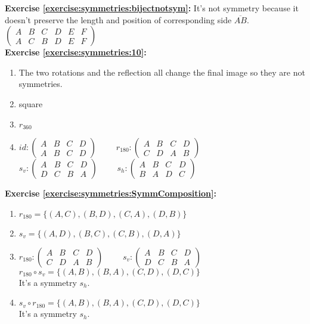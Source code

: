 \noindent\textbf{Exercise \ref{exercise:symmetries:bijectnotsym}:}
It's not symmetry because it doesn't preserve the length and position of corresponding side $\overline{AB}$.\\
$\begin{pmatrix}
A & B & C & D & E & F\\
A & C & B & D & E & F
\end{pmatrix}$\\

\noindent\textbf{Exercise \ref{exercise:symmetries:10}:}
\begin{enumerate}[{a.}]
\item
The two rotations and the reflection all change the final image so they are not symmetries.
\item
square
\item
$r_{360}$
\item
$id: \begin{pmatrix}
A & B & C & D\\
A & B & C & D
\end{pmatrix}$
$\qquad r_{180}: \begin{pmatrix}
A & B & C & D\\
C & D & A & B
\end{pmatrix}$\\
$s_{v}: \begin{pmatrix}
A & B & C & D\\
D & C & B & A
\end{pmatrix}$
$\qquad s_{h}: \begin{pmatrix}
A & B & C & D\\
B & A & D & C
\end{pmatrix}$\\
\end{enumerate}

\noindent\textbf{Exercise \ref{exercise:symmetries:SymmComposition}:}
\begin{enumerate}[{a.}]
\item
$r_{180} = \{(A, C), (B, D), (C, A), (D, B)\}$
\item
$s_v = \{(A, D), (B, C), (C, B), (D, A)\}$
\item 
$r_{180}: \begin{pmatrix}
A & B & C & D\\
C & D & A & B
\end{pmatrix}$
$\qquad s_v: \begin{pmatrix}
A & B & C & D\\
D & C & B & A
\end{pmatrix}$\\
$r_{180}\circ s_v = \{(A,B), (B,A), (C,D), (D,C)\}$\\
It's a symmetry $s_h$.
\item
$s_v\circ r_{180}= \{(A,B), (B,A), (C,D), (D,C)\}$\\
It's a symmetry $s_h$.\\
\end{enumerate}


